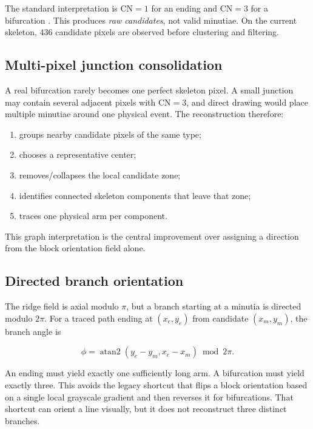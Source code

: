 \documentclass[11pt]{article}
\begin{document}
The standard interpretation is CN$=1$ for an ending and CN$=3$ for a bifurcation \cite{thai2002preprocessing}. This produces \emph{raw candidates}, not valid minutiae. On the current skeleton, 436 candidate pixels are observed before clustering and filtering.

\subsection{Multi-pixel junction consolidation}

A real bifurcation rarely becomes one perfect skeleton pixel. A small junction may contain several adjacent pixels with CN$=3$, and direct drawing would place multiple minutiae around one physical event. The reconstruction therefore:

\begin{enumerate}
  \item groups nearby candidate pixels of the same type;
  \item chooses a representative center;
  \item removes/collapses the local candidate zone;
  \item identifies connected skeleton components that leave that zone;
  \item traces one physical arm per component.
\end{enumerate}

This graph interpretation is the central improvement over assigning a direction from the block orientation field alone.

\subsection{Directed branch orientation}

The ridge field is axial modulo $\pi$, but a branch starting at a minutia is directed modulo $2\pi$. For a traced path ending at $(x_e,y_e)$ from candidate $(x_m,y_m)$, the branch angle is

\begin{equation}
\phi = \operatorname{atan2}(y_e-y_m, x_e-x_m) \bmod 2\pi.
\end{equation}

An ending must yield exactly one sufficiently long arm. A bifurcation must yield exactly three. This avoids the legacy shortcut that flips a block orientation based on a single local grayscale gradient and then reverses it for bifurcations. That shortcut can orient a line visually, but it does not reconstruct three distinct branches.
\end{document}
